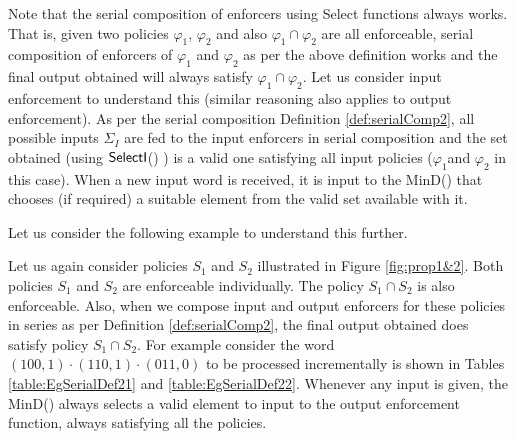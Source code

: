 Note that the serial composition of enforcers using Select functions always works. That is, given two policies $\varphi_1$, $\varphi_2$ and also $\varphi_1 \cap \varphi_2$ are all enforceable, serial composition of enforcers of $\varphi_1$ and $\varphi_2$ as per the above definition works and the final output obtained will always satisfy $\varphi_1 \cap \varphi_2$. Let us consider input enforcement to understand this (similar reasoning also applies to output enforcement).
As per the serial composition Definition \ref{def:serialComp2}, all possible inputs $\Sigma_I$ are fed to the input enforcers in serial composition\blue{,} and the set obtained (using $\mathsf{SelectI}$() ) is a valid one satisfying all input policies ($\varphi_1$and $\varphi_2$ in this case). When a new input word is received, it is input to the MinD() that chooses (if required) a suitable element from the valid set available with it. 

Let us consider the following example to understand this further.

\begin{example}
	Let us again consider policies $S_1$ and $S_2$ illustrated in Figure \ref{fig:prop1&2}. 
	Both policies $S_1$ and $S_2$ are enforceable individually. The policy $S_1 \cap S_2$ is also enforceable. 
	Also, when we compose input and output enforcers for these policies in series as per Definition \ref{def:serialComp2}, the final output obtained does satisfy policy $S_1 \cap S_2$. For example consider the word $(100,1) \cdot (110,1) \cdot (011,0)$ to be processed incrementally is shown in Tables \ref{table:EgSerialDef21} and \ref{table:EgSerialDef22}. Whenever any input is given, the MinD() always selects a valid element to input to the output enforcement function, always satisfying all the policies.
\end{example}

